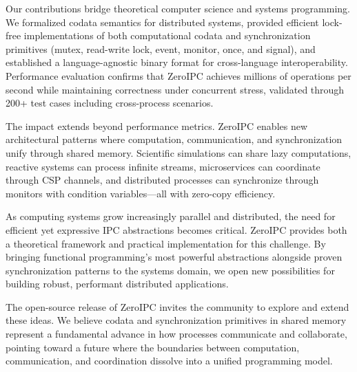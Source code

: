 \documentclass[10pt,conference]{IEEEtran}
\begin{document}
Our contributions bridge theoretical computer science and systems programming. We formalized codata semantics for distributed systems, provided efficient lock-free implementations of both computational codata and synchronization primitives (mutex, read-write lock, event, monitor, once, and signal), and established a language-agnostic binary format for cross-language interoperability. Performance evaluation confirms that ZeroIPC achieves millions of operations per second while maintaining correctness under concurrent stress, validated through 200+ test cases including cross-process scenarios.

The impact extends beyond performance metrics. ZeroIPC enables new architectural patterns where computation, communication, and synchronization unify through shared memory. Scientific simulations can share lazy computations, reactive systems can process infinite streams, microservices can coordinate through CSP channels, and distributed processes can synchronize through monitors with condition variables---all with zero-copy efficiency.

As computing systems grow increasingly parallel and distributed, the need for efficient yet expressive IPC abstractions becomes critical. ZeroIPC provides both a theoretical framework and practical implementation for this challenge. By bringing functional programming's most powerful abstractions alongside proven synchronization patterns to the systems domain, we open new possibilities for building robust, performant distributed applications.

The open-source release of ZeroIPC invites the community to explore and extend these ideas. We believe codata and synchronization primitives in shared memory represent a fundamental advance in how processes communicate and collaborate, pointing toward a future where the boundaries between computation, communication, and coordination dissolve into a unified programming model.
\end{document}
